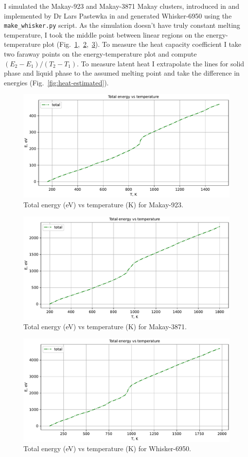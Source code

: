 \documentclass[12pt,a4paper]{article}
\begin{document}
I simulated the Makay-923 and Makay-3871 Makay clusters, introduced in \cite{MakayOriginal} and implemented by Dr Lars Pastewka in \cite{MakayPastewka} and generated Whisker-6950 using the \verb|make_whisker.py| script.
As the simulation doesn't have truly constant melting temperature, I took the middle point between linear regions on the energy-temperature plot (Fig.~\ref{fig:heat-makay1},~\ref{fig:heat-makay2},~\ref{fig:heat-whisker}). To measure the heat capacity coefficient I take two faraway points on the energy-temperature plot and compute $(E_2-E_1)/(T_2-T_1)$. To measure latent heat I extrapolate the lines for solid phase and liquid phase to the assumed melting point and take the difference in energies (Fig.~\ref{fig:heat-estimated}).

\begin{figure}[h!]
	\centering
	\includegraphics[width=.8\linewidth]{img/milestone07-small.pdf}
	\caption{Total energy (eV) vs temperature (K) for Makay-923.}
	\label{fig:heat-makay1}
\end{figure}

\begin{figure}[h!]
	\centering
	\includegraphics[width=.8\linewidth]{img/milestone07-large.pdf}
	\caption{Total energy (eV) vs temperature (K) for Makay-3871.}
	\label{fig:heat-makay2}
\end{figure}

\begin{figure}[h!]
	\centering
	\includegraphics[width=.8\linewidth]{img/milestone07-whisker.pdf}
	\caption{Total energy (eV) vs temperature (K) for Whisker-6950.}
	\label{fig:heat-whisker}
\end{figure}
\end{document}
